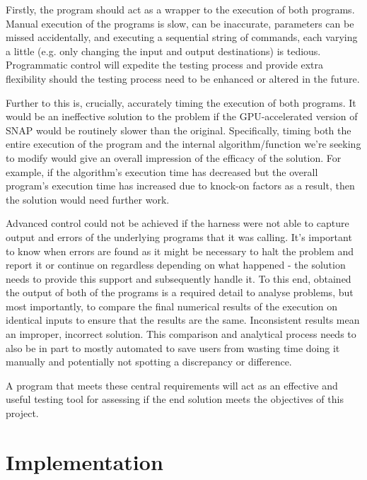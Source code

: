 \documentclass[conference]{IEEEtran}
\begin{document}
Firstly, the program should act as a wrapper to the execution of both programs. Manual execution of the programs is slow, can be inaccurate, parameters can be missed accidentally, and executing a sequential string of commands, each varying a little (e.g. only changing the input and output destinations) is tedious. Programmatic control will expedite the testing process and provide extra flexibility should the testing process need to be enhanced or altered in the future.

Further to this is, crucially, accurately timing the execution of both programs. It would be an ineffective solution to the problem if the GPU-accelerated version of SNAP would be routinely slower than the original. Specifically, timing both the entire execution of the program and the internal algorithm/function we're seeking to modify would give an overall impression of the efficacy of the solution. For example, if the algorithm's execution time has decreased but the overall program's execution time has increased due to knock-on factors as a result, then the solution would need further work.

Advanced control could not be achieved if the harness were not able to capture output and errors of the underlying programs that it was calling. It's important to know when errors are found as it might be necessary to halt the problem and report it or continue on regardless depending on what happened - the solution needs to provide this support and subsequently handle it. To this end, obtained the output of both of the programs is a required detail to analyse problems, but most importantly, to compare the final numerical results of the execution on identical inputs to ensure that the results are the same. Inconsistent results mean an improper, incorrect solution. This comparison and analytical process needs to also be in part to mostly automated to save users from wasting time doing it manually and potentially not spotting a discrepancy or difference.

A program that meets these central requirements will act as an effective and useful testing tool for assessing if the end solution meets the objectives of this project.



\section{Implementation}
\label{sec:implementation}
\end{document}
